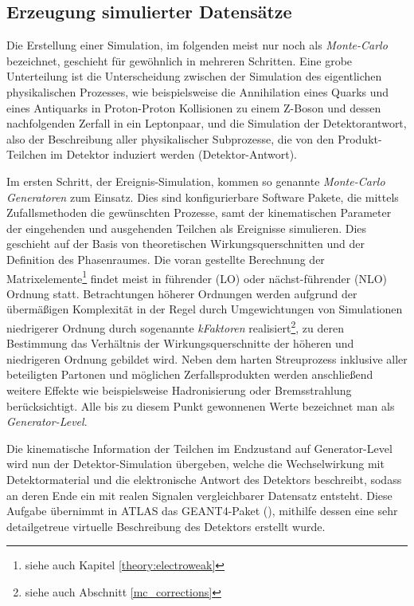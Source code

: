 \subsection{Erzeugung simulierter Datensätze}
\label{event_generation}
Die Erstellung einer Simulation, im folgenden meist nur noch als
\textit{Monte-Carlo} bezeichnet, geschieht für gewöhnlich in mehreren
Schritten. Eine grobe Unterteilung ist die Unterscheidung zwischen der
Simulation des eigentlichen physikalischen Prozesses, wie beispielsweise die
Annihilation eines Quarks und eines Antiquarks in Proton-Proton Kollisionen zu
einem Z-Boson und dessen nachfolgenden Zerfall in ein Leptonpaar, und die
Simulation der Detektorantwort, also der Beschreibung aller physikalischer
Subprozesse, die von den Produkt-Teilchen im Detektor induziert werden
(Detektor-Antwort).

Im ersten Schritt, der Ereignis-Simulation, kommen so genannte
\textit{Monte-Carlo Generatoren} zum Einsatz. Dies sind konfigurierbare
Software Pakete, die mittels Zufallsmethoden die gewünschten Prozesse, samt der
kinematischen Parameter der eingehenden und ausgehenden Teilchen als Ereignisse
simulieren. Dies geschieht auf der Basis von theoretischen
Wirkungsquerschnitten und der Definition des Phasenraumes. Die voran gestellte
Berechnung der Matrixelemente\footnote{siehe auch Kapitel
\ref{theory:electroweak}} findet meist in führender (LO) oder nächst-führender
(NLO) Ordnung statt. Betrachtungen höherer Ordnungen werden aufgrund der
übermäßigen Komplexität in der Regel durch Umgewichtungen von Simulationen
niedrigerer Ordnung durch sogenannte \textit{kFaktoren}
realisiert\footnote{siehe auch Abschnitt \ref{mc_corrections}}, zu deren
Bestimmung das Verhältnis der Wirkungsquerschnitte der höheren und niedrigeren
Ordnung gebildet wird. Neben dem harten Streuprozess inklusive aller
beteiligten Partonen und möglichen Zerfallsprodukten werden anschließend
weitere Effekte wie beispielsweise Hadronisierung oder Bremsstrahlung
berücksichtigt. Alle bis zu diesem Punkt gewonnenen Werte bezeichnet man als
\textit{Generator-Level}.

Die kinematische Information der Teilchen im Endzustand auf Generator-Level
wird nun der Detektor-Simulation übergeben, welche die Wechselwirkung mit
Detektormaterial und die elektronische Antwort des Detektors beschreibt, sodass
an deren Ende ein mit realen Signalen vergleichbarer Datensatz entsteht. Diese
Aufgabe übernimmt in ATLAS das \textsc{GEANT4}-Paket
(\cite{Agostinelli:2002hh}), mithilfe dessen eine sehr detailgetreue virtuelle
Beschreibung des Detektors erstellt wurde.



